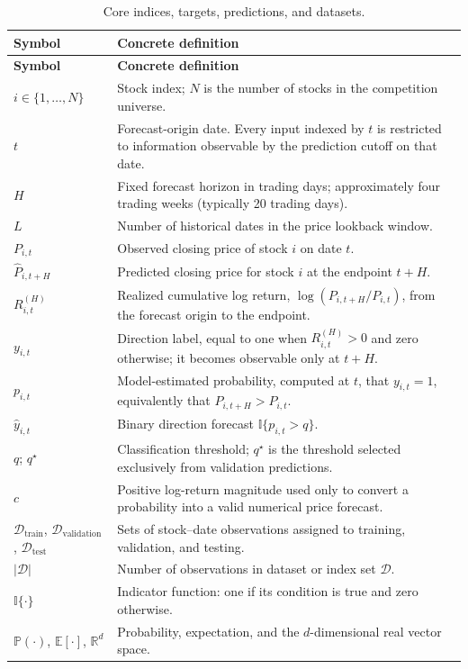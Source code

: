 \documentclass[11pt]{article}
\newcommand{\R}{\mathbb{R}}
\newcommand{\Prob}{\mathbb{P}}
\newcommand{\E}{\mathbb{E}}
\newcommand{\ind}{\mathbb{I}}
\begin{document}
{\renewcommand{\arraystretch}{1.12}
\begin{longtable}{@{}p{}p{}@{}}
\caption{Core indices, targets, predictions, and datasets.}
\label{tab:notation-core}\\
\toprule
\textbf{Symbol} & \textbf{Concrete definition} \\
\midrule
\endfirsthead
\toprule
\textbf{Symbol} & \textbf{Concrete definition} \\
\midrule
\endhead
$i\in\{1,\ldots,N\}$ & Stock index; $N$ is the number of stocks in the competition universe. \\
$t$ & Forecast-origin date. Every input indexed by $t$ is restricted to information observable by the prediction cutoff on that date. \\
$H$ & Fixed forecast horizon in trading days; approximately four trading weeks (typically 20 trading days). \\
$L$ & Number of historical dates in the price lookback window. \\
$P_{i,t}$ & Observed closing price of stock $i$ on date $t$. \\
$\widehat P_{i,t+H}$ & Predicted closing price for stock $i$ at the endpoint $t+H$. \\
$R_{i,t}^{(H)}$ & Realized cumulative log return, $\log(P_{i,t+H}/P_{i,t})$, from the forecast origin to the endpoint. \\
$y_{i,t}$ & Direction label, equal to one when $R_{i,t}^{(H)}>0$ and zero otherwise; it becomes observable only at $t+H$. \\
$p_{i,t}$ & Model-estimated probability, computed at $t$, that $y_{i,t}=1$, equivalently that $P_{i,t+H}>P_{i,t}$. \\
$\widehat y_{i,t}$ & Binary direction forecast $\ind\{p_{i,t}>q\}$. \\
$q$; $q^\star$ & Classification threshold; $q^\star$ is the threshold selected exclusively from validation predictions. \\
$c$ & Positive log-return magnitude used only to convert a probability into a valid numerical price forecast. \\
$\mathcal D_{\mathrm{train}}$, $\mathcal D_{\mathrm{validation}}$, $\mathcal D_{\mathrm{test}}$ & Sets of stock--date observations assigned to training, validation, and testing. \\
$|\mathcal D|$ & Number of observations in dataset or index set $\mathcal D$. \\
$\ind\{\cdot\}$ & Indicator function: one if its condition is true and zero otherwise. \\
$\Prob(\cdot)$, $\E[\cdot]$, $\R^d$ & Probability, expectation, and the $d$-dimensional real vector space. \\
\bottomrule
\end{longtable}

}
\end{document}

